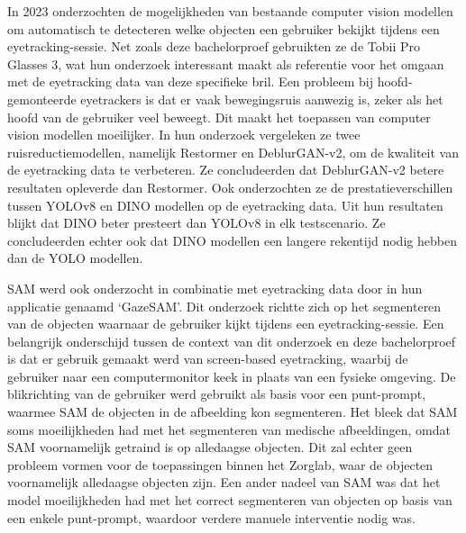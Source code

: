 In 2023 onderzochten \textcite{CederinBremberg2023} de mogelijkheden van bestaande computer vision modellen om automatisch te detecteren welke objecten een gebruiker bekijkt tijdens een eyetracking-sessie.
Net zoals deze bachelorproef gebruikten ze de Tobii Pro Glasses 3, wat hun onderzoek interessant maakt als referentie voor het omgaan met de eyetracking data van deze specifieke bril.
Een probleem bij hoofd-gemonteerde eyetrackers is dat er vaak bewegingsruis aanwezig is, zeker als het hoofd van de gebruiker veel beweegt. Dit maakt het toepassen van computer vision modellen moeilijker.
In hun onderzoek vergeleken ze twee ruisreductiemodellen, namelijk Restormer en DeblurGAN-v2, om de kwaliteit van de eyetracking data te verbeteren. Ze concludeerden dat DeblurGAN-v2 betere resultaten opleverde dan Restormer.
Ook onderzochten ze de prestatieverschillen tussen YOLOv8 en DINO modellen op de eyetracking data. Uit hun resultaten blijkt dat DINO beter presteert dan YOLOv8 in elk testscenario. Ze concludeerden echter ook dat 
DINO modellen een langere rekentijd nodig hebben dan de YOLO modellen.

SAM werd ook onderzocht in combinatie met eyetracking data door \textcite{Wang2023} in hun applicatie genaamd `GazeSAM'. Dit onderzoek richtte zich op het segmenteren van de objecten waarnaar de gebruiker kijkt tijdens een eyetracking-sessie.
Een belangrijk onderschijd tussen de context van dit onderzoek en deze bachelorproef is dat er gebruik gemaakt werd van screen-based eyetracking, waarbij de gebruiker naar een computermonitor keek in plaats van een fysieke omgeving.
De blikrichting van de gebruiker werd gebruikt als basis voor een punt-prompt, waarmee SAM de objecten in de afbeelding kon segmenteren. Het bleek dat SAM soms moeilijkheden had met het segmenteren van medische afbeeldingen, omdat 
SAM voornamelijk getraind is op alledaagse objecten. Dit zal echter geen probleem vormen voor de toepassingen binnen het Zorglab, waar de objecten voornamelijk alledaagse objecten zijn. Een ander nadeel van SAM was dat het model 
moeilijkheden had met het correct segmenteren van objecten op basis van een enkele punt-prompt, waardoor verdere manuele interventie nodig was.